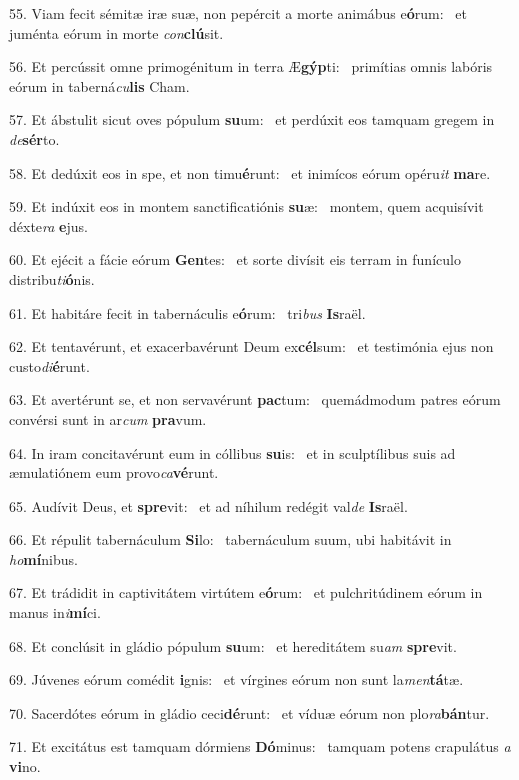 55. Viam fecit sémitæ iræ suæ, non pepércit a morte animábus e\textbf{ó}rum: \ast\  et juménta eórum in morte \textit{con}\textbf{clú}sit.\

56. Et percússit omne primogénitum in terra Æ\textbf{gýp}ti: \ast\  primítias omnis labóris eórum in taberná\textit{cu}\textbf{lis} Cham.\

57. Et ábstulit sicut oves pópulum \textbf{su}um: \ast\  et perdúxit eos tamquam gregem in \textit{de}\textbf{sér}to.\

58. Et dedúxit eos in spe, et non timu\textbf{é}runt: \ast\  et inimícos eórum opéru\textit{it} \textbf{ma}re.\

59. Et indúxit eos in montem sanctificatiónis \textbf{su}æ: \ast\  montem, quem acquisívit déxte\textit{ra} \textbf{e}jus.\

60. Et ejécit a fácie eórum \textbf{Gen}tes: \ast\  et sorte divísit eis terram in funículo distribu\textit{ti}\textbf{ó}nis.\

61. Et habitáre fecit in tabernáculis e\textbf{ó}rum: \ast\  tri\textit{bus} \textbf{Is}raël.\

62. Et tentavérunt, et exacerbavérunt Deum ex\textbf{cél}sum: \ast\  et testimónia ejus non custo\textit{di}\textbf{é}runt.\

63. Et avertérunt se, et non servavérunt \textbf{pac}tum: \ast\  quemádmodum patres eórum convérsi sunt in ar\textit{cum} \textbf{pra}vum.\

64. In iram concitavérunt eum in cóllibus \textbf{su}is: \ast\  et in sculptílibus suis ad æmulatiónem eum provo\textit{ca}\textbf{vé}runt.\

65. Audívit Deus, et \textbf{spre}vit: \ast\  et ad níhilum redégit val\textit{de} \textbf{Is}raël.\

66. Et répulit tabernáculum \textbf{Si}lo: \ast\  tabernáculum suum, ubi habitávit in \textit{ho}\textbf{mí}nibus.\

67. Et trádidit in captivitátem virtútem e\textbf{ó}rum: \ast\  et pulchritúdinem eórum in manus in\textit{i}\textbf{mí}ci.\

68. Et conclúsit in gládio pópulum \textbf{su}um: \ast\  et hereditátem su\textit{am} \textbf{spre}vit.\

69. Júvenes eórum comédit \textbf{i}gnis: \ast\  et vírgines eórum non sunt la\textit{men}\textbf{tá}tæ.\

70. Sacerdótes eórum in gládio ceci\textbf{dé}runt: \ast\  et víduæ eórum non plo\textit{ra}\textbf{bán}tur.\

71. Et excitátus est tamquam dórmiens \textbf{Dó}minus: \ast\  tamquam potens crapulátus \textit{a} \textbf{vi}no.\

